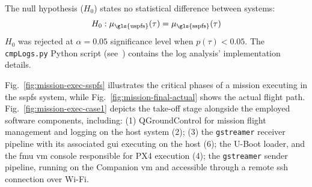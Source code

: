 The null hypothesis ($H_0$) states no statistical difference between systems:
\begin{equation}
H_0: \mu_{\text{\gls{uspfs}}}(\tau) = \mu_{\text{\gls{sspfs}}}(\tau)
\end{equation}
$H_0$ was rejected at $\alpha = 0.05$ significance level when $p(\tau) <
0.05$. The \lstinline{cmpLogs.py} Python script (see~\cite{thesis-sw-github})
contains the log analysis' implementation details.

Fig.~\ref{fig:mission-exec-sspfs} illustrates the critical phases of a mission
executing in the \gls{sspfs} system, while
Fig.~\ref{fig:mission-final-actual} shows the actual flight path.
Fig.~\ref{fig:mission-exec-case1} depicts the take-off stage alongside the
employed software components, including: (1) QGroundControl for mission flight
management and logging on the host system (2); (3) the \lstinline{gstreamer}
receiver pipeline with its associated \gls{gui} executing on the host (6); the
U-Boot loader, and the \gls{fmu} \gls{vm} console responsible for PX4 execution
(4); the \lstinline{gstreamer} sender pipeline, running on the Companion
\gls{vm} and accessible through a remote \gls{ssh} connection over Wi-Fi.

